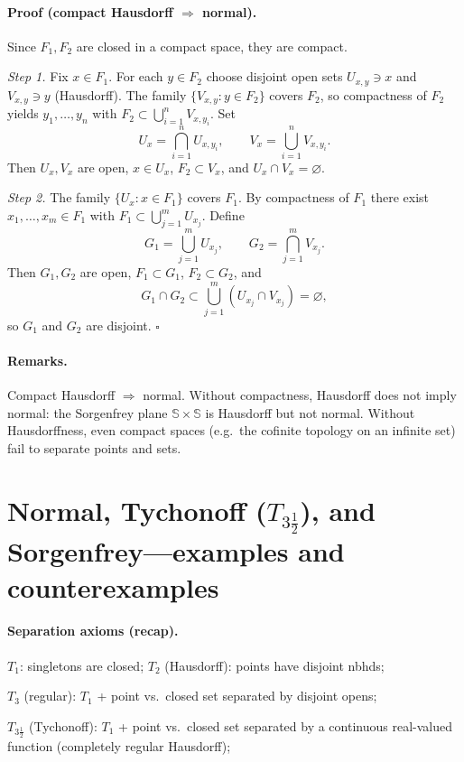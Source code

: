\documentclass[12pt,a4paper]{article}
\newcommand{\qed}{\hfill$\square$}
\theoremstyle{plain}
\theoremstyle{definition}
\theoremstyle{remark}
\theoremstyle{remark}
\begin{document}
	\paragraph{Proof (compact Hausdorff $\Rightarrow$ normal).}
	Since $F_1,F_2$ are closed in a compact space, they are compact.
	
	\emph{Step 1.} Fix $x\in F_1$. For each $y\in F_2$ choose disjoint open sets $U_{x,y}\ni x$ and $V_{x,y}\ni y$ (Hausdorff).
	The family $\{V_{x,y}:y\in F_2\}$ covers $F_2$, so compactness of $F_2$ yields $y_1,\dots,y_n$ with
	$F_2\subset \bigcup_{i=1}^n V_{x,y_i}$. Set
	\[
	U_x=\bigcap_{i=1}^n U_{x,y_i},\qquad V_x=\bigcup_{i=1}^n V_{x,y_i}.
	\]
	Then $U_x,V_x$ are open, $x\in U_x$, $F_2\subset V_x$, and $U_x\cap V_x=\varnothing$.
	
	\emph{Step 2.} The family $\{U_x:x\in F_1\}$ covers $F_1$. By compactness of $F_1$ there exist $x_1,\dots,x_m\in F_1$ with
	$F_1\subset \bigcup_{j=1}^m U_{x_j}$. Define
	\[
	G_1=\bigcup_{j=1}^m U_{x_j},\qquad G_2=\bigcap_{j=1}^m V_{x_j}.
	\]
	Then $G_1,G_2$ are open, $F_1\subset G_1$, $F_2\subset G_2$, and
	\[
	G_1\cap G_2 \subset \bigcup_{j=1}^m (U_{x_j}\cap V_{x_j})=\varnothing,
	\]
	so $G_1$ and $G_2$ are disjoint. \qed
	
	\paragraph{Remarks.}
	Compact Hausdorff $\Rightarrow$ normal. Without compactness, Hausdorff does not imply normal:
	the Sorgenfrey plane $\mathbb{S}\times\mathbb{S}$ is Hausdorff but not normal.
	Without Hausdorffness, even compact spaces (e.g.\ the cofinite topology on an infinite set) fail to separate points and sets.
	
	\section*{Normal, Tychonoff ($T_{3\frac12}$), and Sorgenfrey—examples and counterexamples}
	
	\paragraph{Separation axioms (recap).}
	
	
	$T_1$: singletons are closed; $T_2$ (Hausdorff): points have disjoint nbhds;
	
	$T_3$ (regular): $T_1$ + point vs.\ closed set separated by disjoint opens;
	
	$T_{3\frac12}$ (Tychonoff): $T_1$ + point vs.\ closed set separated by a continuous real-valued function (completely regular Hausdorff);
	
\end{document}
